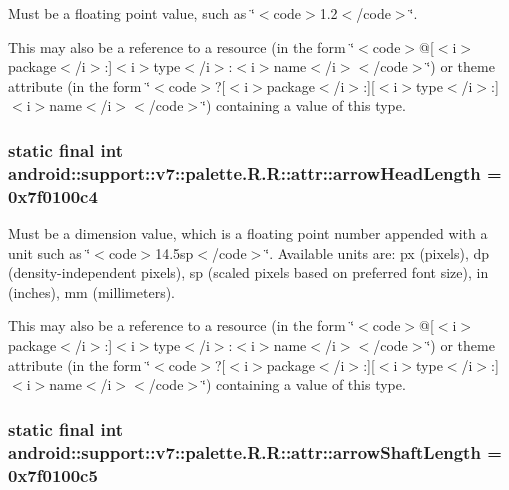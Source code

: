 Must be a floating point value, such as \char`\"{}$<$code$>$1.2$<$/code$>$\char`\"{}. 

This may also be a reference to a resource (in the form \char`\"{}$<$code$>$@\mbox{[}$<$i$>$package$<$/i$>$:\mbox{]}$<$i$>$type$<$/i$>$:$<$i$>$name$<$/i$>$$<$/code$>$\char`\"{}) or theme attribute (in the form \char`\"{}$<$code$>$?\mbox{[}$<$i$>$package$<$/i$>$:\mbox{]}\mbox{[}$<$i$>$type$<$/i$>$:\mbox{]}$<$i$>$name$<$/i$>$$<$/code$>$\char`\"{}) containing a value of this type. \hypertarget{classandroid_1_1support_1_1v7_1_1palette_1_1_r_1_1attr_08aae9cf7d56e47a6bc3897a6cfead6d}{
\subsubsection[{arrowHeadLength}]{\setlength{\rightskip}{0pt plus 5cm}static final int android::support::v7::palette.R.R::attr::arrowHeadLength = 0x7f0100c4}}
\label{classandroid_1_1support_1_1v7_1_1palette_1_1_r_1_1attr_08aae9cf7d56e47a6bc3897a6cfead6d}


Must be a dimension value, which is a floating point number appended with a unit such as \char`\"{}$<$code$>$14.5sp$<$/code$>$\char`\"{}. Available units are: px (pixels), dp (density-independent pixels), sp (scaled pixels based on preferred font size), in (inches), mm (millimeters). 

This may also be a reference to a resource (in the form \char`\"{}$<$code$>$@\mbox{[}$<$i$>$package$<$/i$>$:\mbox{]}$<$i$>$type$<$/i$>$:$<$i$>$name$<$/i$>$$<$/code$>$\char`\"{}) or theme attribute (in the form \char`\"{}$<$code$>$?\mbox{[}$<$i$>$package$<$/i$>$:\mbox{]}\mbox{[}$<$i$>$type$<$/i$>$:\mbox{]}$<$i$>$name$<$/i$>$$<$/code$>$\char`\"{}) containing a value of this type. \hypertarget{classandroid_1_1support_1_1v7_1_1palette_1_1_r_1_1attr_bc6ffbc05702afe70cbd4b6fc7814a23}{
\subsubsection[{arrowShaftLength}]{\setlength{\rightskip}{0pt plus 5cm}static final int android::support::v7::palette.R.R::attr::arrowShaftLength = 0x7f0100c5}}
\label{classandroid_1_1support_1_1v7_1_1palette_1_1_r_1_1attr_bc6ffbc05702afe70cbd4b6fc7814a23}


